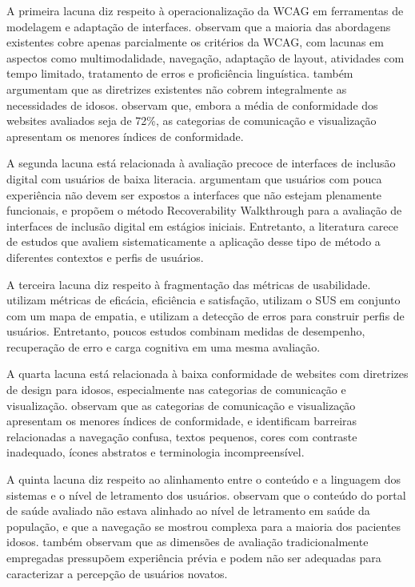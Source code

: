 A primeira lacuna diz respeito à operacionalização da WCAG em ferramentas de modelagem e adaptação de interfaces. \cite{wickramathilaka2023addressing} observam que a maioria das abordagens existentes cobre apenas parcialmente os critérios da WCAG, com lacunas em aspectos como multimodalidade, navegação, adaptação de layout, atividades com tempo limitado, tratamento de erros e proficiência linguística. \cite{sun2010preliminary} também argumentam que as diretrizes existentes não cobrem integralmente as necessidades de idosos. \cite{dombrovskaia2021guideline} observam que, embora a média de conformidade dos websites avaliados seja de 72\%, as categorias de comunicação e visualização apresentam os menores índices de conformidade.

A segunda lacuna está relacionada à avaliação precoce de interfaces de inclusão digital com usuários de baixa literacia. \cite{filgueiras2009recoverability} argumentam que usuários com pouca experiência não devem ser expostos a interfaces que não estejam plenamente funcionais, e propõem o método Recoverability Walkthrough para a avaliação de interfaces de inclusão digital em estágios iniciais. Entretanto, a literatura carece de estudos que avaliem sistematicamente a aplicação desse tipo de método a diferentes contextos e perfis de usuários.

A terceira lacuna diz respeito à fragmentação das métricas de usabilidade. \cite{gatsou2017seniors} utilizam métricas de eficácia, eficiência e satisfação, \cite{allah2021empathy} utilizam o SUS em conjunto com um mapa de empatia, e \cite{taylor2009using} utilizam a detecção de erros para construir perfis de usuários. Entretanto, poucos estudos combinam medidas de desempenho, recuperação de erro e carga cognitiva em uma mesma avaliação.

A quarta lacuna está relacionada à baixa conformidade de websites com diretrizes de design para idosos, especialmente nas categorias de comunicação e visualização. \cite{dombrovskaia2021guideline} observam que as categorias de comunicação e visualização apresentam os menores índices de conformidade, e \cite{gatsou2017seniors} identificam barreiras relacionadas a navegação confusa, textos pequenos, cores com contraste inadequado, ícones abstratos e terminologia incompreensível.

A quinta lacuna diz respeito ao alinhamento entre o conteúdo e a linguagem dos sistemas e o nível de letramento dos usuários. \cite{barron2013feasibility} observam que o conteúdo do portal de saúde avaliado não estava alinhado ao nível de letramento em saúde da população, e que a navegação se mostrou complexa para a maioria dos pacientes idosos. \cite{nosseir2011novice} também observam que as dimensões de avaliação tradicionalmente empregadas pressupõem experiência prévia e podem não ser adequadas para caracterizar a percepção de usuários novatos.

